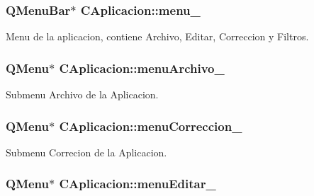 \subsubsection[{\texorpdfstring{menu\+\_\+}{menu_}}]{\setlength{\rightskip}{0pt plus 5cm}Q\+Menu\+Bar$\ast$ C\+Aplicacion\+::menu\+\_\+\hspace{0.3cm}{\ttfamily [private]}}\hypertarget{classCAplicacion_af1ac43fa5f82c2512f211fc0dbb00a3a}{}\label{classCAplicacion_af1ac43fa5f82c2512f211fc0dbb00a3a}


Menu de la aplicacion, contiene Archivo, Editar, Correccion y Filtros. 

\subsubsection[{\texorpdfstring{menu\+Archivo\+\_\+}{menuArchivo_}}]{\setlength{\rightskip}{0pt plus 5cm}Q\+Menu$\ast$ C\+Aplicacion\+::menu\+Archivo\+\_\+\hspace{0.3cm}{\ttfamily [private]}}\hypertarget{classCAplicacion_abdf7a15d27725756e59d4408267d4688}{}\label{classCAplicacion_abdf7a15d27725756e59d4408267d4688}


Submenu Archivo de la Aplicacion. 

\subsubsection[{\texorpdfstring{menu\+Correccion\+\_\+}{menuCorreccion_}}]{\setlength{\rightskip}{0pt plus 5cm}Q\+Menu$\ast$ C\+Aplicacion\+::menu\+Correccion\+\_\+\hspace{0.3cm}{\ttfamily [private]}}\hypertarget{classCAplicacion_acb53cba72e72d1b6feb8203a4942b436}{}\label{classCAplicacion_acb53cba72e72d1b6feb8203a4942b436}


Submenu Correcion de la Aplicacion. 

\subsubsection[{\texorpdfstring{menu\+Editar\+\_\+}{menuEditar_}}]{\setlength{\rightskip}{0pt plus 5cm}Q\+Menu$\ast$ C\+Aplicacion\+::menu\+Editar\+\_\+\hspace{0.3cm}{\ttfamily [private]}}\hypertarget{classCAplicacion_a9753ee6650d3a8922650b09b70fe15b9}{}\label{classCAplicacion_a9753ee6650d3a8922650b09b70fe15b9}


